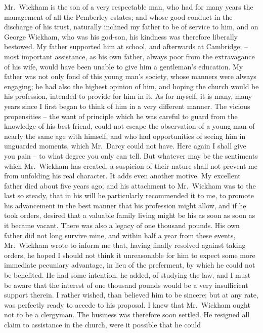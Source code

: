 \begin{letter}
Mr.\ Wickham is the son of a very respectable man, who
had for many years the management of all the Pemberley
estates; and whose good conduct in the discharge of his
trust, naturally inclined my father to be of service to
him, and on George Wickham, who was his god-son, his
kindness was therefore liberally bestowed. My father
supported him at school, and afterwards at Cambridge; -- most
important assistance, as his own father, always poor
from the extravagance of his wife, would have been
unable to give him a gentleman’s education. My father
was not only fond of this young man’s society, whose
manners were always engaging; he had also the highest
opinion of him, and hoping the church would be his
profession, intended to provide for him in it. As for
myself, it is many, many years since I first began to think
of him in a very different manner. The vicious
propensities -- the want of principle which he was careful to
guard from the knowledge of his best friend, could not
escape the observation of a young man of nearly the same
age with himself, and who had opportunities of seeing
him in unguarded moments, which Mr.\ Darcy could not
have. Here again I shall give you pain -- to what degree
you only can tell. But whatever may be the sentiments
which Mr.\ Wickham has created, a suspicion of their
nature shall not prevent me from unfolding his real
character. It adds even another motive. My excellent
father died about five years ago; and his attachment to
Mr.\ Wickham was to the last so steady, that in his will
he particularly recommended it to me, to promote his
advancement in the best manner that his profession might
allow, and if he took orders, desired that a valuable family
living might be his as soon as soon as it became vacant. There
was also a legacy of one thousand pounds. His own father
did not long survive mine, and within half a year from
these events, Mr.\ Wickham wrote to inform me that,
having finally resolved against taking orders, he hoped
I should not think it unreasonable for him to expect
some more immediate pecuniary advantage, in lieu of the
preferment, by which he could not be benefited. He had
some intention, he added, of studying the law, and I must
be aware that the interest of one thousand pounds would
be a very insufficient support therein. I rather wished,
than believed him to be sincere; but at any rate, was
perfectly ready to accede to his proposal. I knew that
Mr.\ Wickham ought not to be a clergyman. The business
was therefore soon settled. He resigned all claim to
assistance in the church, were it possible that he could

\end{letter}

